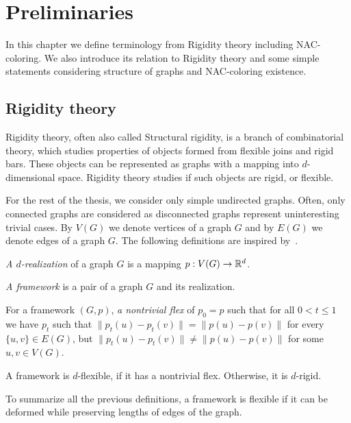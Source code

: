 
\chapter{Preliminaries}

\begin{chapterabstract}

	In this chapter we define terminology from Rigidity theory including NAC-coloring.
	We also introduce its relation to Rigidity theory and
	some simple statements considering
	structure of graphs and NAC-coloring existence.

\end{chapterabstract}

\section{Rigidity theory}

Rigidity theory, often also called Structural rigidity,
is a branch of combinatorial theory,
which studies properties of objects formed from flexible joins and rigid bars.
These objects can be represented as graphs with
a mapping into \( d \)-dimensional space.
Rigidity theory studies if such objects are rigid, or flexible.

For the rest of the thesis,
we consider only simple undirected graphs.
Often, only connected graphs are considered as disconnected graphs
represent uninteresting trivial cases.
By \( V(G) \) we denote vertices of a graph \( G \) and
by \( E(G) \) we denote edges of a graph \( G \).
The following definitions are inspired by~\cite{np_complete,my_paper}.

%
\begin{definition}[\( d \)-realization]
	\emph{A \( d \)-realization} of a graph \( G \) is a mapping \( p: V(G) \to \mathbb{R}^d \).
\end{definition}
%
\begin{definition}[Framework]
	\emph{A framework} is a pair of a graph \( G \) and its realization.
\end{definition}
%
\begin{definition}
	For a framework \( (G, p) \), \emph{a nontrivial flex} of
	\( p_0 = p \) such that for all \( 0 < t \le 1 \) we have \( p_t \) such that
	\( \|p_t(u) - p_t(v)\| = \|p(u) - p(v)\|\) for every \( \{u, v\} \in E(G) \),
	but \( \|p_t(u) - p_t(v)\| \ne \|p(u) - p(v)\| \) for some \( u, v \in V (G) \).
\end{definition}
%
\begin{definition}
	A framework is \( d \)-flexible, if it has a nontrivial flex.
	Otherwise, it is \( d \)-rigid.
\end{definition}
%
To summarize all the previous definitions,
a framework is flexible if it can be deformed while preserving lengths of
edges of the graph.

